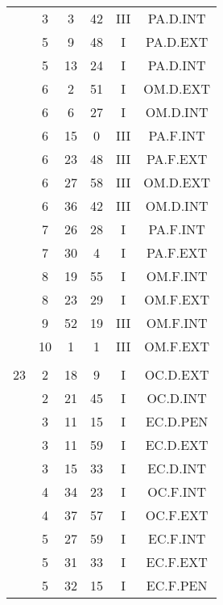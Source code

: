 \documentclass[12pt, a4paper]{article}
\begin{document}
\begin{multicols}{3}
{\begin{tabular}{c c c c c c}
	 	 	 	 & 3 & 3 & 42 & III & PA.D.INT\\%
	 	 	 	 & 5 & 9 & 48 & I & PA.D.EXT\\%
	 	 	 	 & 5 & 13 & 24 & I & PA.D.INT\\%
	 	 	 	 & 6 & 2 & 51 & I & OM.D.EXT\\%
	 	 	 	 & 6 & 6 & 27 & I & OM.D.INT\\%
	 	 	 	 & 6 & 15 & 0 & III & PA.F.INT\\%
	 	 	 	 & 6 & 23 & 48 & III & PA.F.EXT\\%
	 	 	 	 & 6 & 27 & 58 & III & OM.D.EXT\\%
	 	 	 	 & 6 & 36 & 42 & III & OM.D.INT\\%
	 	 	 	 & 7 & 26 & 28 & I & PA.F.INT\\%
	 	 	 	 & 7 & 30 & 4 & I & PA.F.EXT\\%
	 	 	 	 & 8 & 19 & 55 & I & OM.F.INT\\%
	 	 	 	 & 8 & 23 & 29 & I & OM.F.EXT\\%
	 	 	 	 & 9 & 52 & 19 & III & OM.F.INT\\%
	 	 	 	 & 10 & 1 & 1 & III & OM.F.EXT\\%
	 	 	 	 & & & & & \\%
	 	 	 	23 & 2 & 18 & 9 & I & OC.D.EXT\\%
	 	 	 	 & 2 & 21 & 45 & I & OC.D.INT\\%
	 	 	 	 & 3 & 11 & 15 & I & EC.D.PEN\\%
	 	 	 	 & 3 & 11 & 59 & I & EC.D.EXT\\%
	 	 	 	 & 3 & 15 & 33 & I & EC.D.INT\\%
	 	 	 	 & 4 & 34 & 23 & I & OC.F.INT\\%
	 	 	 	 & 4 & 37 & 57 & I & OC.F.EXT\\%
	 	 	 	 & 5 & 27 & 59 & I & EC.F.INT\\%
	 	 	 	 & 5 & 31 & 33 & I & EC.F.EXT\\%
	 	 	 	 & 5 & 32 & 15 & I & EC.F.PEN\\%
	 	 \end{tabular}
 	}
\end{multicols}
\end{document}
